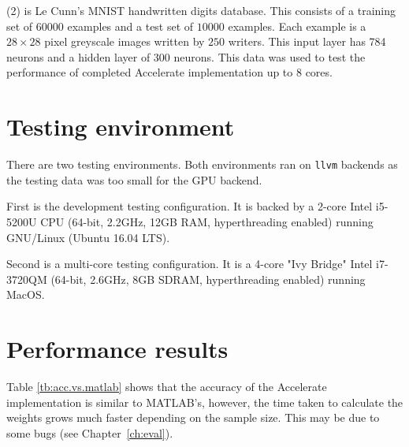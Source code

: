 (2) is Le Cunn's MNIST handwritten digits database. This consists of a training set of $60000$ examples and a test set of $10000$ examples. Each example is a $28 \times 28$ pixel greyscale images written by $250$ writers. This input layer has 784 neurons and a hidden layer of 300 neurons. This data was used to test the performance of completed Accelerate implementation up to 8 cores.

\section{Testing environment}\label{se:res.testsys}
There are two testing environments. Both environments ran on \texttt{llvm} backends as the testing data was too small for the GPU backend. 

First is the development testing configuration. It is backed by a 2-core Intel i5-5200U CPU (64-bit, 2.2GHz, 12GB RAM, hyperthreading enabled) running GNU/Linux (Ubuntu 16.04 LTS). 

Second is a multi-core testing configuration. It is a 4-core "Ivy Bridge" Intel i7-3720QM (64-bit, 2.6GHz, 8GB SDRAM, hyperthreading enabled) running MacOS.

\section{Performance results}\label{se:res.performance}

Table \ref{tb:acc.vs.matlab} shows that the accuracy of the Accelerate implementation is similar to MATLAB's, however, the time taken to calculate the weights grows much faster depending on the sample size. This may be due to some bugs (see Chapter~\ref{ch:eval}).

\begin{table}
\centering
{}
	\caption{Benchmarking compared to MATLAB results.}
	\label{tb:acc.vs.matlab}
\end{table}

